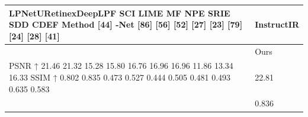 \begin{tabular}{ll}
\toprule
LPNetURetinexDeepLPF SCI LIME MF NPE SRIE SDD CDEF Method [44] -Net [86] [56] [52] [27] [23] [79] [24] [28] [41] & InstructIR \\
\midrule
 & Ours \\
PSNR ↑ 21.46 21.32 15.28 15.80 16.76 16.96 16.96 11.86 13.34 16.33 SSIM ↑ 0.802 0.835 0.473 0.527 0.444 0.505 0.481 0.493 0.635 0.583 & 22.81 \\
 & 0.836 \\
\bottomrule
\end{tabular}
